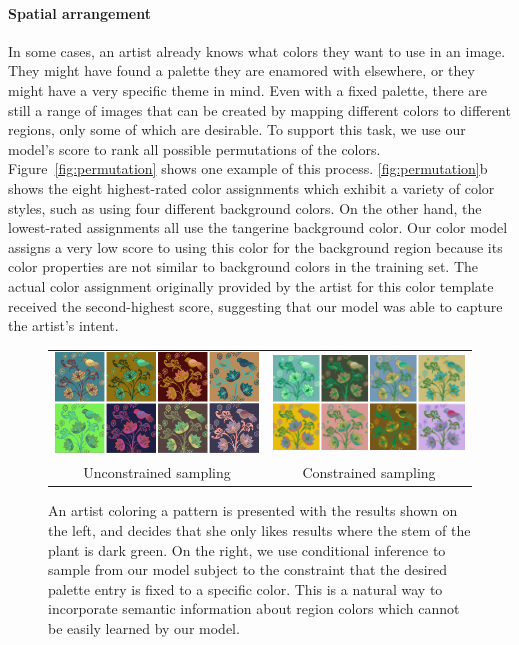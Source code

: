 \paragraph{Spatial arrangement} In some cases, an artist already knows what colors they want to use in an image. They might have found a palette they are enamored with elsewhere, or they might have a very specific theme in mind. Even with a fixed palette, there are still a range of images that can be created by mapping different colors to different regions, only some of which are desirable. To support this task, we use our model's score to rank all possible permutations of the colors. Figure~\ref{fig:permutation} shows one example of this process. \ref{fig:permutation}b shows the eight highest-rated color assignments which exhibit a variety of color styles, such as using four different background colors. On the other hand, the lowest-rated assignments all use the tangerine background color. Our color model assigns a very low score to using this color for the background region because its color properties are not similar to background colors in the training set. The actual color assignment originally provided by the artist for this color template received the second-highest score, suggesting that our model was able to capture the artist's intent.

\begin{figure}[ht]
\begin{tabular}{cc} 
\includegraphics[width=.475\linewidth]{figs/constrainedSearchUnconstrained}&\includegraphics[width=.475\linewidth]{figs/constrainedSearchConstrained}\\
Unconstrained sampling&Constrained sampling\\
\end{tabular}

\caption{An artist coloring a pattern is presented with the results shown on the left, and decides that she only likes results where the stem of the plant is dark green. On the right, we use conditional inference to sample from our model subject to the constraint that the desired palette entry is fixed to a specific color. This is a natural way to incorporate semantic information about region colors which cannot be easily learned by our model.}
\label{fig:constrainedInference}
\vspace{-1.0em}
\end{figure}

